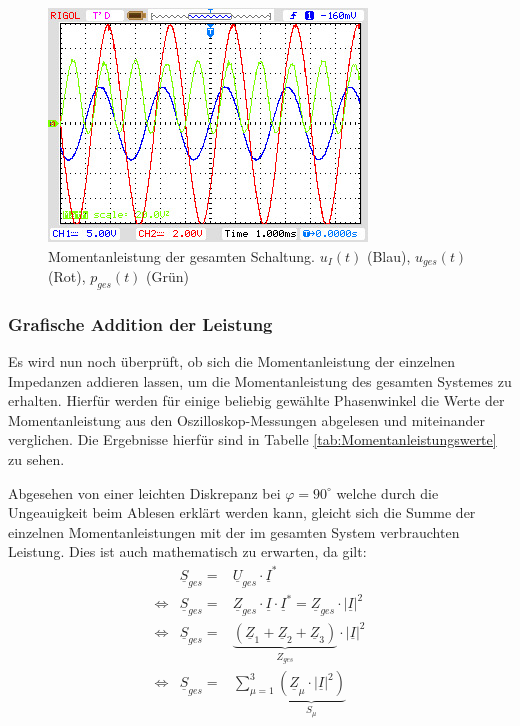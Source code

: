\begin{figure}[H]
\centering
\includegraphics[width=0.7\linewidth]{Oszi-Bitmaps/NewFile3.jpg}
\caption{Momentanleistung der gesamten Schaltung. $u_I(t)$ (Blau), $u_{ges}(t)$ (Rot), $p_{ges}(t)$ (Grün)}
\label{fig:MomLKurveGesamt}
\end{figure}

\subsubsection{Grafische Addition der Leistung}
Es wird nun noch überprüft, ob sich die Momentanleistung der einzelnen Impedanzen addieren lassen, um die Momentanleistung des gesamten Systemes zu erhalten. Hierfür werden für einige beliebig gewählte Phasenwinkel die Werte der Momentanleistung aus den Oszilloskop-Messungen abgelesen und miteinander verglichen. Die Ergebnisse hierfür sind in Tabelle \ref{tab:Momentanleistungswerte} zu sehen.

Abgesehen von einer leichten Diskrepanz bei $\varphi = 90^\circ$ welche durch die Ungeauigkeit beim Ablesen erklärt werden kann, gleicht sich die Summe der einzelnen Momentanleistungen mit der im gesamten System verbrauchten Leistung. Dies ist auch mathematisch zu erwarten, da gilt:
\begin{eqnarray*}
& \underline{S}_{ges} =& \underline{U}_{ges}\cdot\underline{I}^* \\
\Leftrightarrow &\underline{S}_{ges} =& \underline{Z}_{ges}\cdot\underline{I}\cdot\underline{I}^* = \underline{Z}_{ges}\cdot |\underline{I}|^2 \\
\Leftrightarrow & \underline{S}_{ges} =& \underbrace{(\underline{Z}_1 + \underline{Z}_2 + \underline{Z}_3)}_{Z_{ges}} \cdot |\underline{I}|^2 \\
\Leftrightarrow & \underline{S}_{ges} =& \sum_{\mu=1}^3 \underbrace{\left(\underline{Z}_\mu \cdot |\underline{I}|^2\right)}_{S_\mu}\\
\end{eqnarray*}